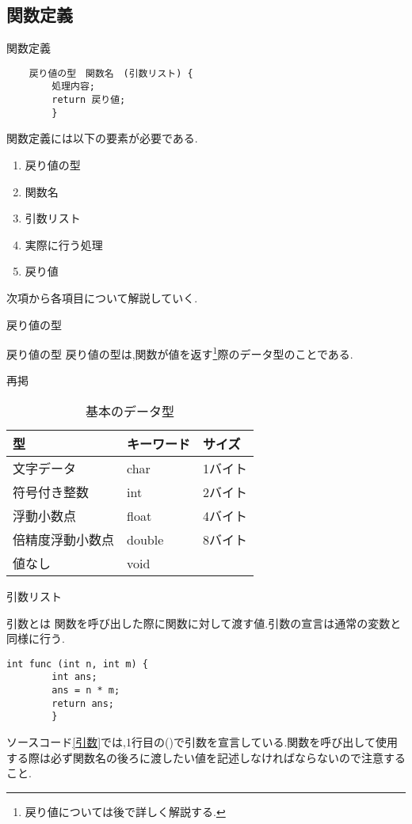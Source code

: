 \documentclass[xdvipdfmx, 8pt, t]{beamer}
\begin{document}
\subsection{関数定義}
\begin{frame}[fragile]{関数定義}
\begin{lstlisting}
    戻り値の型　関数名　(引数リスト) {
        処理内容;
        return 戻り値;
        }
\end{lstlisting}
関数定義には以下の要素が必要である.
\begin{enumerate}
    \item 戻り値の型
    \item 関数名
    \item 引数リスト
    \item 実際に行う処理
    \item 戻り値
\end{enumerate}
次項から各項目について解説していく.
\end{frame}

\begin{frame}{戻り値の型}
    \begin{block}{戻り値の型}
        戻り値の型は,関数が値を返す\footnote{戻り値については後で詳しく解説する.}際のデータ型のことである.
    \end{block}
    \begin{exampleblock}{再掲}
        \begin{table}[]
            \centering
            \begin{tabular}{|l|l|l|}
                \hline
                型       & キーワード  & サイズ\\
                \hline
                文字データ & char  & 1バイト\\
                符号付き整数 & int  & 2バイト\\
                浮動小数点 & float & 4バイト\\
                倍精度浮動小数点 & double & 8バイト\\
                値なし & void & \\
                \hline
            \end{tabular}
            \caption{基本のデータ型}
            \label{tab:my_label}
        \end{table}        
    \end{exampleblock}
\end{frame}

\begin{frame}[fragile]{引数リスト}
    \begin{block}{引数とは}
        関数を呼び出した際に関数に対して渡す値.引数の宣言は通常の変数と同様に行う.
    \end{block}
    \begin{lstlisting}[caption=引数の例,label=引数]
        int func (int n, int m) {
        int ans;
        ans = n * m;
        return ans;
        }
    \end{lstlisting}
    ソースコード\ref{引数}では,1行目の()で引数を宣言している.関数を呼び出して使用する際は必ず関数名の後ろに渡したい値を記述しなければならないので注意すること.
\end{frame}
\end{document}
